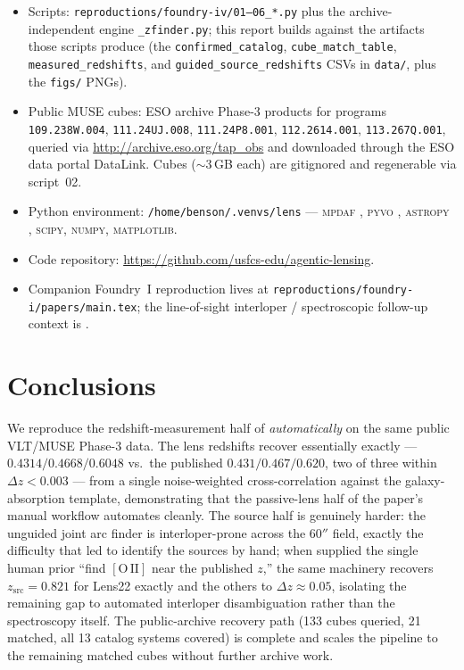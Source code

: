 \documentclass[11pt,letterpaper]{article}
\newcommand{\zsrc}{\ensuremath{z_{\mathrm{src}}}}
\newcommand{\dz}{\ensuremath{\Delta z}}
\newcommand{\muse}{\textsc{MUSE}}
\newcommand{\mpdaf}{\textsc{mpdaf}}
\newcommand{\OII}{\ensuremath{[\mathrm{O\,II}]}}
\begin{document}
\begin{itemize}
\item Scripts: \texttt{reproductions/foundry-iv/01--06\_*.py} plus the
      archive-independent engine \texttt{\_zfinder.py}; this report builds against
      the artifacts those scripts produce (the \texttt{confirmed\_catalog},
      \texttt{cube\_match\_table}, \texttt{measured\_redshifts}, and
      \texttt{guided\_source\_redshifts} CSVs in \texttt{data/}, plus the
      \texttt{figs/} PNGs).
\item Public \muse{} cubes: ESO archive Phase-3 products for programs
      \texttt{109.238W.004}, \texttt{111.24UJ.008}, \texttt{111.24P8.001},
      \texttt{112.2614.001}, \texttt{113.267Q.001}, queried via
      \url{http://archive.eso.org/tap_obs} and downloaded through the ESO data
      portal DataLink. Cubes ($\sim$3\,GB each) are gitignored and regenerable
      via script~02.
\item Python environment: \texttt{/home/benson/.venvs/lens} ---
      \mpdaf{} \autocite{mpdaf}, \textsc{pyvo} \autocite{pyvo},
      \textsc{astropy} \autocite{astropy2022}, \textsc{scipy}, \textsc{numpy},
      \textsc{matplotlib}.
\item Code repository: \url{https://github.com/usfcs-edu/agentic-lensing}.
\item Companion Foundry~I reproduction lives at
      \texttt{reproductions/foundry-i/papers/main.tex}; the line-of-sight
      interloper / spectroscopic follow-up context is \citet{cikota2023}.
\end{itemize}

\section{Conclusions}

We reproduce the redshift-measurement half of \citet{lin2025foundry4}
\emph{automatically} on the same public VLT/\muse{} Phase-3 data. The lens
redshifts recover essentially exactly --- $0.4314/0.4668/0.6048$ vs.\ the
published $0.431/0.467/0.620$, two of three within $\dz < 0.003$ --- from a
single noise-weighted cross-correlation against the galaxy-absorption template,
demonstrating that the passive-lens half of the paper's manual workflow
automates cleanly. The source half is genuinely harder: the unguided joint arc
finder is interloper-prone across the $60''$ field, exactly the difficulty that
led \citet{lin2025foundry4} to identify the sources by hand; when supplied the
single human prior ``find \OII{} near the published $z$,'' the same machinery
recovers $\zsrc = 0.821$ for Lens22 exactly and the others to $\dz \approx 0.05$,
isolating the remaining gap to automated interloper disambiguation rather than
the spectroscopy itself. The public-archive recovery path (133 cubes queried,
21 matched, all 13 catalog systems covered) is complete and scales the pipeline
to the remaining matched cubes without further archive work.
\end{document}
